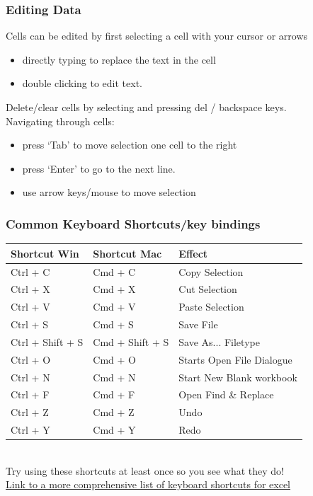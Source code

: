\documentclass[12pt]{beamer}
\begin{document}
	\begin{frame}
		\frametitle{Editing Data}
		Cells can be edited by first selecting a cell with your cursor or arrows
		\begin{itemize}
			\item directly typing to replace the text in the cell
			\item double clicking to edit text. 
		\end{itemize}
		Delete/clear cells by selecting and pressing del / backspace keys. \\
		Navigating through cells: \begin{itemize}
			\item press  `Tab' to move selection one cell to the right
			\item press `Enter' to go to the next line.
			\item use arrow keys/mouse to move selection 
		\end{itemize}
	\end{frame}
	\begin{frame}
		\frametitle{Common Keyboard Shortcuts/key bindings}
			\begin{tabular}{|l|l|l|}
				\hline
				Shortcut Win & Shortcut Mac & Effect \\
				\hline
				Ctrl + C & Cmd + C & Copy Selection \\
				Ctrl + X & Cmd + X & Cut Selection \\
				Ctrl + V & Cmd + V & Paste Selection\\
				Ctrl + S & Cmd + S & Save File \\
				Ctrl + Shift + S & Cmd + Shift + S & Save As... Filetype \\ 
				Ctrl + O & Cmd + O & Starts Open File Dialogue \\
				Ctrl + N & Cmd + N & Start New Blank workbook \\
				Ctrl + F & Cmd + F & Open Find \& Replace\\
				Ctrl + Z & Cmd + Z & Undo \\
				Ctrl + Y & Cmd + Y & Redo \\
				\hline
			\end{tabular}\\
		\bigskip
		Try using these shortcuts at least once so you see what they do!\\
		\textcolor{blue}{\href{https://support.microsoft.com/en-us/office/keyboard-shortcuts-in-excel-1798d9d5-842a-42b8-9c99-9b7213f0040f}{Link to a more comprehensive list of keyboard shortcuts for excel}}
	\end{frame}
\end{document}
